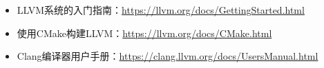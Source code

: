 
\begin{itemize}
\item
LLVM系统的入门指南：\url{https://llvm.org/docs/GettingStarted.html}

\item
使用CMake构建LLVM：\url{https://llvm.org/docs/CMake.html}

\item
Clang编译器用户手册：\url{https://clang.llvm.org/docs/UsersManual.html}
\end{itemize}
